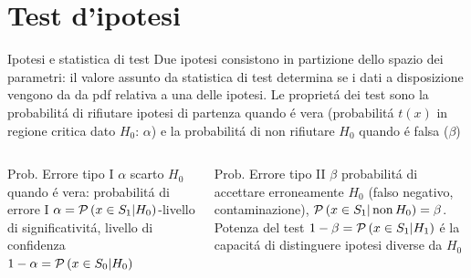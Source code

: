 \documentclass[asd-beamer.tex]{subfiles}
\begin{document}
\section{Test d'ipotesi}

\begin{frame}{Ipotesi e statistica di test}
Due ipotesi consistono in partizione dello spazio dei parametri: il valore assunto da statistica di test determina se i dati a disposizione vengono da da pdf relativa a una delle ipotesi. Le propriet\'a dei test sono la probabilit\'a di rifiutare ipotesi di partenza quando \'e vera (probabilit\'a $t(x)$ in regione critica dato $H_0$: $\alpha$) e la probabilit\'a di non rifiutare $H_0$ quando \'e falsa ($\beta$)
\begin{columns}[T]
\begin{column}{0.45\textwidth}
	\begin{block}{Prob. Errore tipo I $\alpha$}
		scarto $H_0$ quando \'e vera: probabilit\'a di errore I $\alpha=\operatorname{\mathcal{P}}{(x\in S_1|H_0)}$-livello di significativit\'a, livello di confidenza $1-\alpha=\operatorname{\mathcal{P}}{(x\in S_0|H_0)}$
	\end{block}
\end{column}
\begin{column}{0.55\textwidth}
	\begin{block}{Prob. Errore tipo II $\beta$}
		probabilit\'a di accettare erroneamente $H_0$ (falso negativo, contaminazione), $\operatorname{\mathcal{P}}{(x\in S_1|\operatorname{non}{H_0})}=\beta$. Potenza del test $1-\beta=\operatorname{\mathcal{P}}{(x\in S_1|H_1)}$ \'e la capacit\'a di distinguere ipotesi diverse da $H_0$ 
	\end{block}
\end{column}
\end{columns}
\end{frame}
\end{document}
